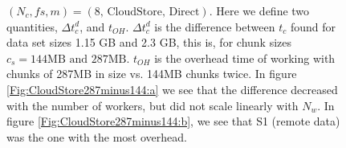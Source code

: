 \documentclass{rspublic}
\begin{document}
\begin{figure}
\begin{center}
\caption{$(N_c, f\!s, m) = (\mbox{8, CloudStore, Direct})$. Here
we define two quantities, $\Delta t_c^d$, and $t_{OH}$. $\Delta t_c^d$
is the difference between $t_c$ found for data set sizes 1.15 GB and
2.3 GB, this is, for chunk sizes $c_s = 144\mbox{MB and } 287\mbox{MB}$.
$t_{OH}$ is the overhead time of working with chunks of 287MB in size
vs. 144MB chunks twice. In figure \ref{Fig:CloudStore287minus144:a} we
see that the difference decreased with the number of workers, but did
not scale linearly with $N_w$. In figure
\ref{Fig:CloudStore287minus144:b}, we see that S1 (remote data)
was the one with the most overhead.}
\label{Fig:CloudStore287minus144}
\end{center}
\vspace{-0.3cm}
\end{figure}
\end{document}
